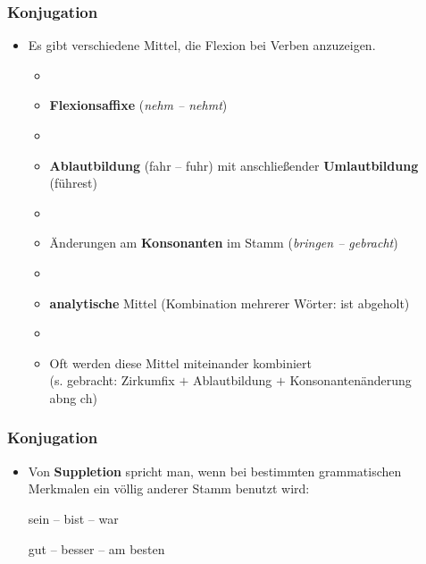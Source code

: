 
\begin{frame}
\frametitle{Konjugation}

\begin{itemize}
\item Es gibt verschiedene Mittel, die Flexion bei Verben anzuzeigen. 

\begin{itemize}
\item[]
\item \textbf{Flexionsaffixe} (\textit{nehm -- nehmt}) 
\item[]
\item \textbf{Ablautbildung} (fahr -- fuhr) mit anschließender \textbf{Umlautbildung} (führest) 
\item[]
\item Änderungen am \textbf{Konsonanten} im Stamm (\textit{bringen -- gebracht})
\item[]
\item \textbf{analytische} Mittel (Kombination mehrerer Wörter: ist abgeholt) 
\item[]
\item Oft werden diese Mittel miteinander kombiniert\\
(s. gebracht: Zirkumfix  $+$ Ablautbildung  $+$ Konsonantenänderung \\ab{ng \ras ch})
\end{itemize}

\end{itemize}


\end{frame}




\begin{frame}
\frametitle{Konjugation}

\begin{itemize}
\item Von \textbf{Suppletion} spricht man, wenn bei bestimmten grammatischen Merkmalen ein völlig anderer Stamm benutzt wird:

\vspace{1em}

\ea sein -- bist -- war
\z

\ea gut -- besser -- am besten
\z



\end{itemize}


\end{frame}



